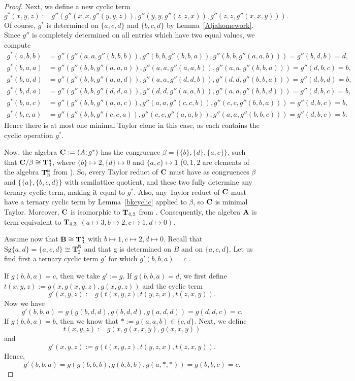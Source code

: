 \documentclass[11pt]{amsart}
\newcommand{\m}[1]{\mathbf{\uppercase{#1}}}
\newcommand{\n}{\scriptscriptstyle{\mathsf{N}}}
\theoremstyle{definition}
\theoremstyle{remark}
\theoremstyle{plain}
\def\T{\mathbf{T}}
\begin{document}
\begin{proof}
Next, we define a new cyclic term
 $$g^*(x,y,z):=g''(g''(x,x,g''(y,y,z)),g''(y,y,g''(z,z,x)),g''(z,z,g''(x,x,y))).$$
Of course, $g^*$ is determined on $\{a,c,d\}$ and $\{b,c,d\}$ by Lemma~\ref{Aljahomework}. Since $g''$ is completely determined on all entries which have two equal values, we compute
\begin{align*}
g^*(a,b,b)&=g''(g''(a,a,g''(b,b,b)),g''(b,b,g''(b,b,a)),g''(b,b,g''(a,a,b)))=g''(b,d,b)=d,\\
g^*(b,a,a)&=g''(g''(b,b,g''(a,a,a)),g''(a,a,g''(a,a,b)),g''(a,a,g''(b,b,a)))=
g''(d,b,c)=b,\\
g^*(b,a,d)&=g''(g''(b,b,g''(a,a,d)),g''(a,a,g''(d,d,b)),g''(d,d,g''(b,b,a)))
=g''(d,b,d)=b,\\
g^*(b,d,a)&=g''(g''(b,b,g''(d,d,a)),g''(d,d,g''(a,a,b)),g''(a,a,g''(b,b,d)))
=g''(d,b,c)=b,\\
g^*(b,a,c)&=g''(g''(b,b,g''(a,a,c)),g''(a,a,g''(c,c,b)),g''(c,c,g''(b,b,a)))=
g''(d,b,c)=b,\\
g^*(b,c,a)&=g''(g''(b,b,g''(c,c,a)),g''(c,c,g''(a,a,b)),g''(a,a,g''(b,b,c)))
=g''(d,b,c)=b.
\end{align*}
Hence there is at most one minimal Taylor clone in this case, as each contains the cyclic operation $g^*$.


Now, the algebra $\m c:=(A;g^*)$ has the congruence $\beta=\{\{b\},\{d\},\{a,c\}\}$, such that ${\m c}/\beta\cong {\m T}_3^{\n}$, where $\{b\}\mapsto 2, \{d\}\mapsto 0$ and $\{a,c\}\mapsto 1$ ($0,1,2$ are elements of the algebra ${\m T}_3^{\n}$ from ). So, every Taylor reduct of $\m c$ must have as congruences $\beta$ and $\{\{a\},\{b,c,d\}\}$ with semilattice quotient, and these two fully determine any ternary cyclic term, making it equal to $g^*$. Also, any Taylor reduct of $\m c$ must have a ternary cyclic term by Lemma~\ref{bkcyclic} applied to $\beta$, so $\m c$ is minimal Taylor. Moreover, $\m c$ is isomorphic to ${\m T}_{4,3}$ from . Consequently, the algebra $\m A$ is term-equivalent to ${\m T}_{4,3}$ $(a\mapsto 3, b\mapsto 2, c\mapsto 1, d\mapsto 0)$.

Assume now that $\m b\cong{\m T}_3^{\n}$ with $b\mapsto 1, c\mapsto 2, d\mapsto 0$. Recall that $\mathrm{Sg}\{a,d\}=\{a,c,d\}\cong {\T}_2^{\n}$ and that g is determined on $B$ and on $\{a,c,d\}$. Let us find first a ternary cyclic term $g'$ for which $g'(b,b,a)=c$ .

If $g(b,b,a)=c$, then we take $g':=g$. If $g(b,b,a)=d$, we first define $t(x,y,z):=g(x,g(x,y,z),g(x,y,z))$ and the cyclic term $$g'(x,y,z):=g(t(x,y,z),t(y,z,x),t(z,x,y)).$$ Now we have
$$g'(b,b,a)=g(g(b,d,d),g(b,d,d),g(a,d,d))=g(d,d,c)=c.$$
If $g(b,b,a)=b$, then we know that $\ast:=g(a,a,b)\in \{c,d\}$. Next, we define $$t(x,y,z):=g(x,g(x,x,y),g(x,x,y))$$ and $$g'(x,y,z):=g(t(x,y,z),t(y,z,x),t(z,x,y)).$$ Hence,
$$g'(b,b,a)=g(g(b,b,b),g(b,b,b),g(a,\ast,\ast))=g(b,b,c)=c.$$


\end{proof}
\end{document}
